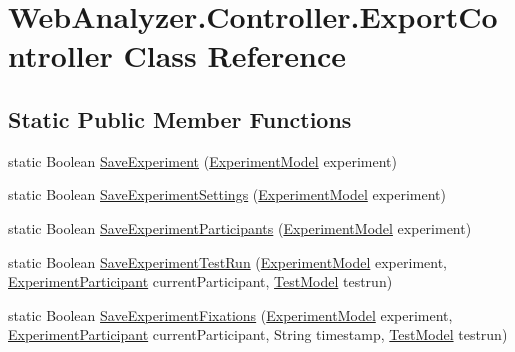 \hypertarget{class_web_analyzer_1_1_controller_1_1_export_controller}{}\section{Web\+Analyzer.\+Controller.\+Export\+Controller Class Reference}
\label{class_web_analyzer_1_1_controller_1_1_export_controller}
\subsection*{Static Public Member Functions}
\begin{DoxyCompactItemize}
\item 
static Boolean \hyperlink{class_web_analyzer_1_1_controller_1_1_export_controller_a4b85a3cd4921ac619d484d0c3d2b031b}{Save\+Experiment} (\hyperlink{class_web_analyzer_1_1_models_1_1_base_1_1_experiment_model}{Experiment\+Model} experiment)
\item 
static Boolean \hyperlink{class_web_analyzer_1_1_controller_1_1_export_controller_a293a07018f0a6c4380482d58c5080852}{Save\+Experiment\+Settings} (\hyperlink{class_web_analyzer_1_1_models_1_1_base_1_1_experiment_model}{Experiment\+Model} experiment)
\item 
static Boolean \hyperlink{class_web_analyzer_1_1_controller_1_1_export_controller_a8f08f0812bc86eaca9e42e076874ea94}{Save\+Experiment\+Participants} (\hyperlink{class_web_analyzer_1_1_models_1_1_base_1_1_experiment_model}{Experiment\+Model} experiment)
\item 
static Boolean \hyperlink{class_web_analyzer_1_1_controller_1_1_export_controller_a6053d7ce4cb34a29e17a212d5613cc79}{Save\+Experiment\+Test\+Run} (\hyperlink{class_web_analyzer_1_1_models_1_1_base_1_1_experiment_model}{Experiment\+Model} experiment, \hyperlink{class_web_analyzer_1_1_models_1_1_base_1_1_experiment_participant}{Experiment\+Participant} current\+Participant, \hyperlink{class_web_analyzer_1_1_models_1_1_data_model_1_1_test_model}{Test\+Model} testrun)
\item 
static Boolean \hyperlink{class_web_analyzer_1_1_controller_1_1_export_controller_accf8d0d7a9f4d46df35a5ed77d26cb4c}{Save\+Experiment\+Fixations} (\hyperlink{class_web_analyzer_1_1_models_1_1_base_1_1_experiment_model}{Experiment\+Model} experiment, \hyperlink{class_web_analyzer_1_1_models_1_1_base_1_1_experiment_participant}{Experiment\+Participant} current\+Participant, String timestamp, \hyperlink{class_web_analyzer_1_1_models_1_1_data_model_1_1_test_model}{Test\+Model} testrun)

\end{DoxyCompactItemize}
